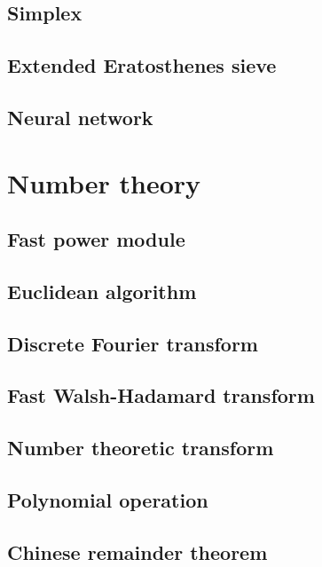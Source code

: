 \documentclass[titlepage, a4paper,10pt]{article}
\begin{document}
\begin{multicols}{2}
\begin{spacing}{0.6}
{			\subsection{Simplex}
				
			\subsection{Extended Eratosthenes sieve}
				
			\subsection{Neural network}
				
		\section{Number theory}
			\subsection{Fast power module}
				
			\subsection{Euclidean algorithm}
				
			\subsection{Discrete Fourier transform}
				
			\subsection{Fast Walsh-Hadamard transform}
				
			\subsection{Number theoretic transform}
				
			\subsection{Polynomial operation}
				
			\subsection{Chinese remainder theorem}
				
}
\end{spacing}
\end{multicols}
\end{document}
